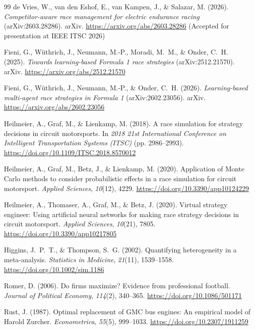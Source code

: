 \begin{thebibliography}{99}
de Vries, W., van den Eshof, E., van Kampen, J., \& Salazar, M. (2026).
\emph{Competitor-aware race management for electric endurance racing}
(arXiv:2603.28286). arXiv. \url{https://arxiv.org/abs/2603.28286} (Accepted for
presentation at IEEE ITSC 2026)

Fieni, G., W\"uthrich, J., Neumann, M.-P., Moradi, M.~M., \& Onder, C.~H.
(2025). \emph{Towards learning-based Formula 1 race strategies}
(arXiv:2512.21570). arXiv. \url{https://arxiv.org/abs/2512.21570}

Fieni, G., W\"uthrich, J., Neumann, M.-P., \& Onder, C.~H. (2026).
\emph{Learning-based multi-agent race strategies in Formula 1}
(arXiv:2602.23056). arXiv. \url{https://arxiv.org/abs/2602.23056}

Heilmeier, A., Graf, M., \& Lienkamp, M. (2018). A race simulation for strategy
decisions in circuit motorsports. In \emph{2018 21st International Conference
on Intelligent Transportation Systems (ITSC)} (pp. 2986--2993).
\url{https://doi.org/10.1109/ITSC.2018.8570012}

Heilmeier, A., Graf, M., Betz, J., \& Lienkamp, M. (2020). Application of Monte
Carlo methods to consider probabilistic effects in a race simulation for
circuit motorsport. \emph{Applied Sciences}, \emph{10}(12), 4229.
\url{https://doi.org/10.3390/app10124229}

Heilmeier, A., Thomaser, A., Graf, M., \& Betz, J. (2020). Virtual strategy
engineer: Using artificial neural networks for making race strategy decisions
in circuit motorsport. \emph{Applied Sciences}, \emph{10}(21), 7805.
\url{https://doi.org/10.3390/app10217805}

Higgins, J.~P.~T., \& Thompson, S.~G. (2002). Quantifying heterogeneity in a
meta-analysis. \emph{Statistics in Medicine}, \emph{21}(11), 1539--1558.
\url{https://doi.org/10.1002/sim.1186}

Romer, D. (2006). Do firms maximize? Evidence from professional football.
\emph{Journal of Political Economy}, \emph{114}(2), 340--365.
\url{https://doi.org/10.1086/501171}

Rust, J. (1987). Optimal replacement of GMC bus engines: An empirical model of
Harold Zurcher. \emph{Econometrica}, \emph{55}(5), 999--1033.
\url{https://doi.org/10.2307/1911259}


\end{thebibliography}
